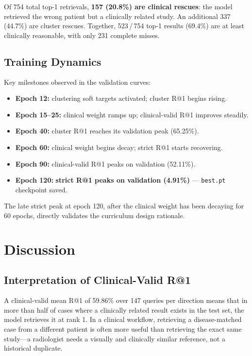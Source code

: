 \documentclass[11pt, a4paper]{article}
\begin{document}
Of 754 total top-1 retrievals, \textbf{157 (20.8\%) are clinical rescues}:
the model retrieved the wrong patient but a clinically related study.
An additional 337 (44.7\%) are cluster rescues.
Together, 523\,/\,754 top-1 results (69.4\%) are at least clinically
reasonable, with only 231 complete misses.

\subsection{Training Dynamics}

Key milestones observed in the validation curves:

\begin{itemize}[leftmargin=1.5em]
  \item \textbf{Epoch 12:} clustering soft targets activated; cluster R@1
    begins rising.
  \item \textbf{Epoch 15--25:} clinical weight ramps up; clinical-valid R@1
    improves steadily.
  \item \textbf{Epoch 40:} cluster R@1 reaches its validation peak
    (65.25\%).
  \item \textbf{Epoch 60:} clinical weight begins decay; strict R@1 starts
    recovering.
  \item \textbf{Epoch 90:} clinical-valid R@1 peaks on validation (52.11\%).
  \item \textbf{Epoch 120:} \textbf{strict R@1 peaks on validation (4.91\%)}
    --- \texttt{best.pt} checkpoint saved.
\end{itemize}

The late strict peak at epoch 120, after the clinical weight has been
decaying for 60 epochs, directly validates the curriculum design rationale.

\section{Discussion}
\label{sec:discussion}

\subsection{Interpretation of Clinical-Valid R@1}

A clinical-valid mean R@1 of 59.86\% over 147 queries per direction means
that in more than half of cases where a clinically related result exists in
the test set, the model retrieves it at rank 1.
In a clinical workflow, retrieving a disease-matched case from a different
patient is often more useful than retrieving the exact same study---a
radiologist needs a visually and clinically similar reference, not a
historical duplicate.
\end{document}

